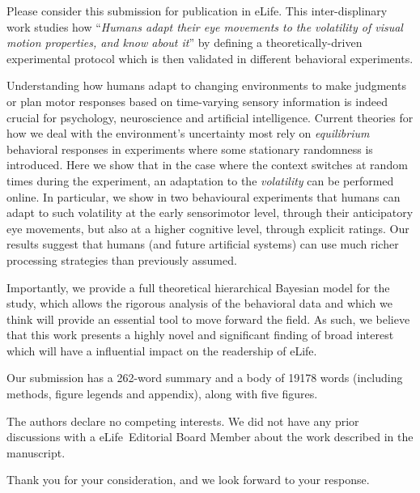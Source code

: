 \documentclass[stdletter,8pt,dateno]{newlfm}%
\newcommand{\Title}{Humans adapt their eye movements to the volatility of visual motion properties, and know about it}
\newcommand{\Journal}{eLife}%
\begin{document}
\begin{newlfm}
%

Please consider this submission for publication in \Journal . This inter-displinary work studies how ``\emph{\Title}'' by defining a theoretically-driven experimental protocol which is then validated in different behavioral experiments.

Understanding how humans adapt to changing environments to make judgments or plan motor responses based on time-varying sensory information 
is indeed crucial for psychology, neuroscience
and artificial intelligence.  
Current theories for how we deal with the environment's uncertainty most rely on \emph{equilibrium} behavioral responses in experiments where some stationary randomness is introduced.  
Here we show that in the case where the context switches at random times during the experiment, an adaptation to the \emph{volatility} can be performed online.
In particular, we show in two behavioural experiments that humans can adapt to such volatility at the early sensorimotor level, through their anticipatory eye movements, but also at a higher cognitive level, through explicit ratings. 
Our results suggest that humans (and future artificial
systems) can use much richer processing strategies than previously
assumed.

Importantly, we provide a full theoretical hierarchical Bayesian model for the study, which allows the rigorous analysis of the behavioral data and which we think will provide an essential tool to move forward the field. 
As such, we believe that this work presents a highly novel and significant finding of broad interest 
which will have a influential impact on the readership of \Journal .

Our submission has a 262-word summary and a body of 19178 words
(including methods, figure legends and appendix), along with five figures.

The authors declare no competing interests.
We did not have any prior discussions with
a \Journal\ Editorial Board Member
about the work described in the manuscript.

Thank you for your consideration, and we look forward to your response.

\end{newlfm}
\end{document}
